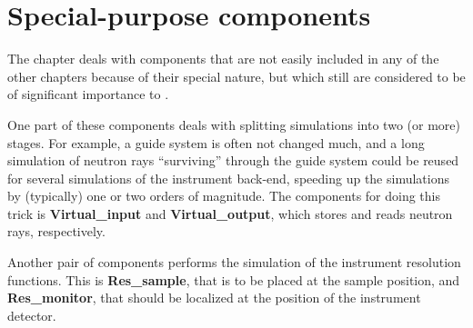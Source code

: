 \chapter{Special-purpose components}

The chapter deals with components that are not easily included 
in any of the other chapters because of their special nature,
but which still are considered to be of significant importance 
to \MCS .

One part of these components deals with splitting simulations
into two (or more) stages. For example, a guide system is often
not changed much, and a long simulation of neutron rays
``surviving'' through the guide system could be reused 
for several simulations of the instrument back-end, speeding up
the simulations by (typically) one or two orders of magnitude.
The components for doing this trick is {\bf Virtual\_input} and
{\bf Virtual\_output}, which stores and reads neutron rays, respectively.

Another pair of components performs the simulation of the instrument
resolution functions. This is {\bf Res\_sample}, that is to be
placed at the sample position, and {\bf Res\_monitor}, that should
be localized at the position of the instrument detector. 

\newpage



\newpage

